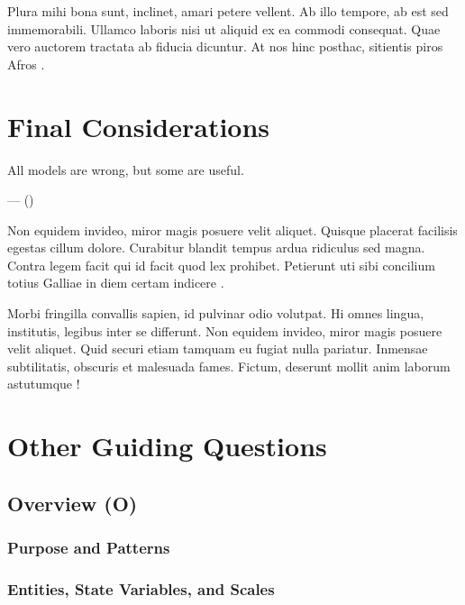 \documentclass[
  man,
  10pt,
  a4paper,
  floatsintext
]{apa7}
\begin{document}
Plura mihi bona sunt, inclinet, amari petere vellent. Ab illo tempore, ab est sed immemorabili. Ullamco laboris nisi ut aliquid ex ea commodi consequat. Quae vero auctorem tractata ab fiducia dicuntur. At nos hinc posthac, sitientis piros Afros \autocite{ballot2000}.


\section{Final Considerations}

\begingroup
  \setlength{}
  \epigraph{All models are wrong, but some are useful.}{---  (\citeyear{box1979})}
\endgroup

Non equidem invideo, miror magis posuere velit aliquet. Quisque placerat facilisis egestas cillum dolore. Curabitur blandit tempus ardua ridiculus sed magna. Contra legem facit qui id facit quod lex prohibet. Petierunt uti sibi concilium totius Galliae in diem certam indicere \autocite{gilbert2000}.

Morbi fringilla convallis sapien, id pulvinar odio volutpat. Hi omnes lingua, institutis, legibus inter se differunt. Non equidem invideo, miror magis posuere velit aliquet. Quid securi etiam tamquam eu fugiat nulla pariatur. Inmensae subtilitatis, obscuris et malesuada fames. Fictum, deserunt mollit anim laborum astutumque \autocite{epstein2006}!



\printbibliography
\appendix

\section{Other Guiding Questions}

\subsection{Overview (O)}

\subsubsection{Purpose and Patterns}

\begin{guidingbox}
\end{guidingbox}

\subsubsection{Entities, State Variables, and Scales}
\end{document}
